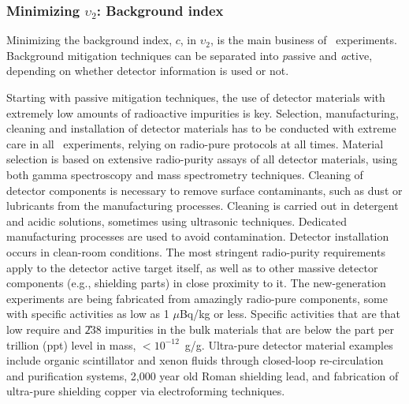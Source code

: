  

\subsubsection{Minimizing $\upsilon_2$: Background index} \label{subsec:bgr_mitigation}

Minimizing the background index, $c$, in $\upsilon_2$, is the main business of 
\bbonu\ experiments. 
Background mitigation techniques can be separated into {\emph passive} and {\emph active}, depending on whether detector information is used or not.

Starting with passive mitigation techniques, the use of detector materials with extremely low amounts of radioactive impurities is key. Selection, manufacturing, cleaning and installation of detector materials has to be conducted with extreme care in all \bbonu\ experiments, relying on radio-pure protocols at all times. Material selection is based on extensive radio-purity assays of all detector materials, using both gamma spectroscopy and mass spectrometry techniques. Cleaning of detector components is necessary to remove surface contaminants, such as dust or lubricants from the manufacturing processes. Cleaning is carried out in detergent and acidic solutions, sometimes using ultrasonic techniques. Dedicated manufacturing processes are used to avoid contamination. Detector installation occurs in clean-room conditions. The most stringent radio-purity requirements apply to the detector active target itself, as well as to other massive detector components (e.g., shielding parts) in close proximity to it. The new-generation experiments are being fabricated from amazingly radio-pure components, some with specific activities as low as 1 $\mu$Bq/kg or less. Specific activities that are that low require  and \U{238} impurities in the bulk materials that are below the part per trillion (ppt) level in mass, $<10^{-12}$~g/g. Ultra-pure detector material examples include organic scintillator and xenon fluids through closed-loop re-circulation and purification systems, 2,000 year old Roman shielding lead, and fabrication of ultra-pure shielding copper via electroforming techniques.

